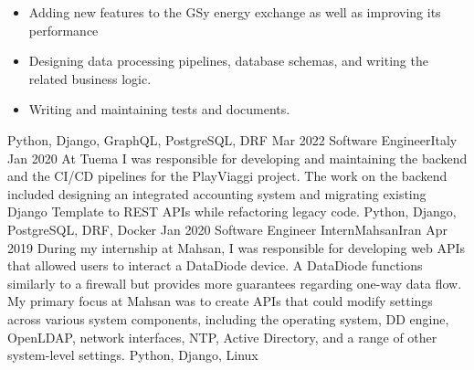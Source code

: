 \begin{experiences}
{    \begin{itemize}
      \item Adding new features to the GSy energy exchange as well as improving its performance
      \item Designing data processing pipelines, database schemas, and writing the related business logic.
      \item Writing and maintaining tests and documents.
    \end{itemize}
  }
  {Python, Django, GraphQL, PostgreSQL, DRF}
  \emptySeparator
  \experience
  {Mar 2022} {Software Engineer}{}{Italy}
  {Jan 2020} {
    At Tuema I was responsible for developing and maintaining the backend and the CI/CD pipelines for the PlayViaggi project. The work on the backend included designing an integrated accounting system and migrating existing Django Template to REST APIs while refactoring legacy code.
  }
  {Python, Django, PostgreSQL, DRF, Docker}
  \emptySeparator
  \experience
  {Jan 2020} {Software Engineer Intern}{Mahsan}{Iran}
  {Apr 2019} {
    During my internship at Mahsan, I was responsible for developing web APIs that allowed users to interact a DataDiode device. A DataDiode functions similarly to a firewall but provides more guarantees regarding one-way data flow. My primary focus at Mahsan was to create APIs that could modify settings across various system components, including the operating system, DD engine, OpenLDAP, network interfaces, NTP, Active Directory, and a range of other system-level settings.
  }
  {Python, Django, Linux}
  \emptySeparator
\end{experiences}
